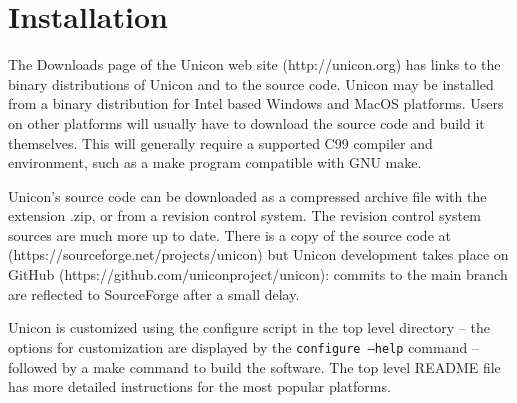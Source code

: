 \chapter{Installation}

The Downloads page of the Unicon web site (http://unicon.org) has
links to the binary distributions of Unicon and to the source code.
Unicon may be installed from a binary distribution for Intel based
Windows and MacOS platforms. Users on other platforms will usually have
to download the source code and build it themselves.  This will
generally require a supported C99 compiler and environment, such as a
make program compatible with GNU make.

Unicon's source code can be downloaded as a compressed
archive file with the extension .zip, or from a revision control
system. The revision control system sources are much more up to date.
There is a copy of the source code at
(https://sourceforge.net/projects/unicon) but Unicon development takes
place on GitHub (https://github.com/uniconproject/unicon): commits to the
main branch are reflected to SourceForge after a small delay.

Unicon is customized using the configure script in the top level directory
-- the options for customization are displayed by the {\tt configure --help}
command -- followed by a make command to build the software.  The top level
README file has more detailed instructions for the most popular platforms.
